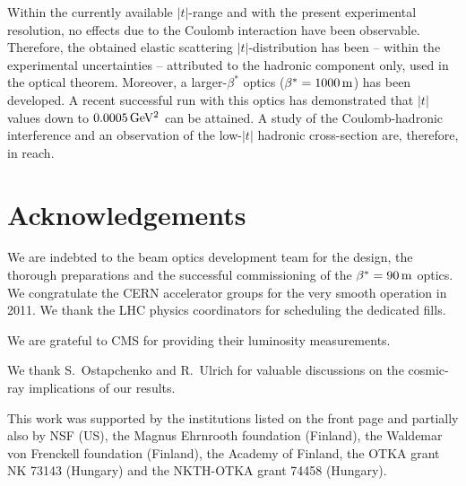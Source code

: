 \documentclass[TOTEM]{cern/cernphprep}
\def\un#1{\,{\rm #1}}
\def\acknowledgments{\section*{Acknowledgements}}
\begin{document}
Within the currently available $|t|$-range and with the present experimental resolution, no effects due to the Coulomb interaction have been observable. Therefore, the obtained elastic scattering $|t|$-distribution has been -- within the experimental uncertainties -- attributed to the hadronic component only, used in the optical theorem. Moreover, a larger-$\beta^*$ optics ($\beta^* = 1000\un{m}$) has been developed. A recent successful run with this optics has demonstrated that $|t|$ values down to $0.0005\un{GeV^2}$ can be attained. A study of the Coulomb-hadronic interference and an observation of the low-$|t|$ hadronic cross-section are, therefore, in reach.

\acknowledgments

We are indebted to the beam optics development team
for the design, the thorough preparations and the successful commissioning of the $\beta^* = 90\un{m}$ optics. We congratulate the CERN accelerator groups for the very smooth operation in 2011. We thank
the LHC physics coordinators for scheduling the dedicated fills.

We are grateful to CMS for providing their luminosity measurements.

We thank S.~Ostapchenko and R.~Ulrich for valuable discussions on the cosmic-ray implications of our results.

This work was supported by the institutions listed on the front page and partially also by NSF (US), the Magnus
Ehrnrooth foundation (Finland), the Waldemar von Frenckell foundation (Finland), the Academy of
Finland, the OTKA grant NK 73143 (Hungary) and the NKTH-OTKA grant 74458 (Hungary).
\end{document}
